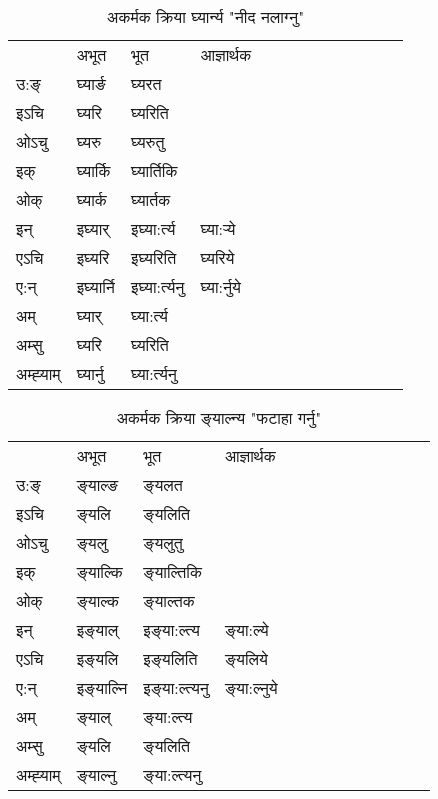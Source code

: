 \begin{table}[H]
\label{ɛr.vi} \centering
\caption{अकर्मक क्रिया  घ्यार्न्य  "नीद नलाग्नु"  }
\begin{tabular}{l|l|l|l|l|l|l|l|l|l|l|l|l}  \toprule
&अभूत & भूत & आज्ञार्थक \\ 
उ:ङ्‌ &घ्यार्ङ &घ्यरत \\ 
इऽचि &घ्यरि &घ्यरिति   \\ 
ओऽचु &घ्यरु &घ्यरुतु   \\ 
इक् &घ्यार्कि &घ्यार्तिकि   \\ 
ओक् &घ्यार्क &घ्यार्तक   \\ 
इन् & इघ्यार् & इघ्या:र्त्य &घ्या:र्‍ये  \\ 
एऽचि & इघ्यरि & इघ्यरिति &घ्यरिये    \\ 
ए:न् & इघ्यार्नि  & इघ्या:र्त्यनु &घ्या:र्नुये  \\ 
अम् & घ्यार् & घ्या:र्त्य   \\ 
अम्सु & घ्यरि & घ्यरिति   \\ 
अम्ह्‍याम् & घ्यार्नु  & घ्या:र्त्यनु \\ 
\bottomrule
\end{tabular}
\end{table}


\begin{table}[H]
\label{ɛl.vi} \centering
\caption{अकर्मक क्रिया  ङ्‌याल्न्य  "फटाहा गर्नु"  }
\begin{tabular}{l|l|l|l|l|l|l|l|l|l|l|l|l}  \toprule
&अभूत & भूत & आज्ञार्थक \\ 
उ:ङ्‌ &ङ्‌याल्ङ &ङ्‌यलत \\ 
इऽचि &ङ्‌यलि &ङ्‌यलिति   \\ 
ओऽचु &ङ्‌यलु &ङ्‌यलुतु   \\ 
इक् &ङ्‌याल्कि &ङ्‌याल्तिकि   \\ 
ओक् &ङ्‌याल्क &ङ्‌याल्तक   \\ 
इन् & इङ्‌याल् & इङ्‌या:ल्त्य &ङ्‌या:ल्ये  \\ 
एऽचि & इङ्‌यलि & इङ्‌यलिति &ङ्‌यलिये    \\ 
ए:न् & इङ्‌याल्नि  & इङ्‌या:ल्त्यनु &ङ्‌या:ल्नुये  \\ 
अम् & ङ्‌याल् & ङ्‌या:ल्त्य   \\ 
अम्सु & ङ्‌यलि & ङ्‌यलिति   \\ 
अम्ह्‍याम् & ङ्‌याल्नु  & ङ्‌या:ल्त्यनु \\ 
\bottomrule
\end{tabular}
\end{table}


